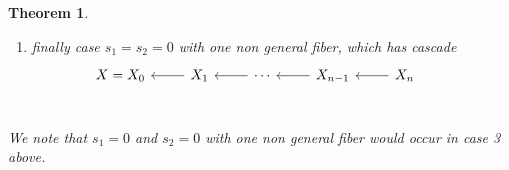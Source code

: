 \documentclass[12pt,a4paper]{book}      %
\newtheorem{thm}{Theorem}[section]
\theoremstyle{definition}
\begin{document}
\begin{thm}
\begin{enumerate}
\[\begin{tikzcd}
      &                              &                               &                                      & X_1 \arrow[ld] \arrow[lu] & X_2 \arrow[l] & X_3 \arrow[l]\\
X_b^0 & X_b^1 \arrow[l] & \cdots \arrow[l] & X_b^{b-1} \arrow[l] &                                                           &                       
\end{tikzcd}
\]
\item finally case $s_1 = s_2 =0$ with one non general fiber, which has cascade 
\[
\begin{tikzcd}
X = X_0 & X_1 \arrow[l] & \cdots \arrow[l] & X_{n-1} \arrow[l] & X_{n} \arrow[l]  &  \\
\end{tikzcd}
\]
\end{enumerate}
We note that $s_1=0$ and $s_2 = 0$ with one non general fiber would occur in case 3 above.



\end{thm}
\end{document}
